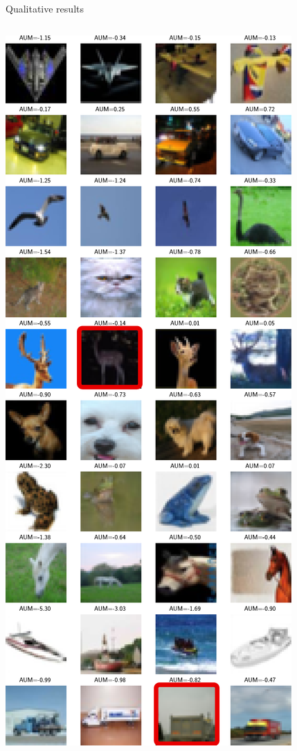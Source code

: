 \begin{frame}{Qualitative results}{}
\begin{columns}
\begin{column}{.3\textwidth}
            \vspace{.25cm}

            \centering
            \includegraphics[width=\textwidth, clip, trim={0cm 0cm 0cm 12cm}]{../chapters/images/lowest_aum_cut.pdf}
        \end{column}

    \end{columns}

\end{frame}

